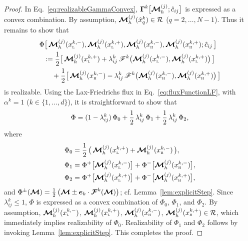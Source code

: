 \begin{proof}
  In Eq.~\eqref{eq:realizableGammaConvex}, $\boldsymbol{\Gamma}^{k}\big[\boldsymbol{\mathcal{M}}_{h}^{(j)};\hat{c}_{ij}\big]$ is expressed as a convex combination.  
  By assumption, $\boldsymbol{\mathcal{M}}_{h}^{(j)}(\hat{x}_{q}^{k})\in\mathcal{R}$ ($q=2,\ldots,N-1$).  
  Thus it remains to show that
  \begin{align*}
    &\Phi\big[\,\boldsymbol{\mathcal{M}}_{h}^{(j)}(x_{\textnormal{\tiny\textsc{L}}}^{k,-}),\boldsymbol{\mathcal{M}}_{h}^{(j)}(x_{\textnormal{\tiny\textsc{L}}}^{k,+}),\boldsymbol{\mathcal{M}}_{h}^{(j)}(x_{\textnormal{\tiny\textsc{H}}}^{k,-}),\boldsymbol{\mathcal{M}}_{h}^{(j)}(x_{\textnormal{\tiny\textsc{H}}}^{k,+});\hat{c}_{ij}\,\big] \\
    &\hspace{6pt}
    :=\frac{1}{2}\big[\,\boldsymbol{\mathcal{M}}_{h}^{(j)}(x_{\textnormal{\tiny\textsc{L}}}^{k,+})+\lambda_{ij}^{k}\,\mathscr{F}^{k}\big(\boldsymbol{\mathcal{M}}_{h}^{(j)}(x_{\textnormal{\tiny\textsc{L}}}^{k,-}),\boldsymbol{\mathcal{M}}_{h}^{(j)}(x_{\textnormal{\tiny\textsc{L}}}^{k,+})\big)\,\big] \\
    &\hspace{18pt}
    +\frac{1}{2}\big[\,\boldsymbol{\mathcal{M}}_{h}^{(j)}(x_{\textnormal{\tiny\textsc{H}}}^{k,-})-\lambda_{ij}^{k}\,\mathscr{F}^{k}\big(\boldsymbol{\mathcal{M}}_{h}^{(j)}(x_{\textnormal{\tiny\textsc{H}}}^{k,-}),\boldsymbol{\mathcal{M}}_{h}^{(j)}(x_{\textnormal{\tiny\textsc{H}}}^{k,+})\big)\,\big]
  \end{align*}
  is realizable.  
  Using the Lax-Friedrichs flux in Eq.~\eqref{eq:fluxFunctionLF}, with $\alpha^{k}=1$ ($k\in\{1,\ldots,d\}$), it is straightforward to show that
  \begin{equation}
    \Phi=(1-\lambda_{ij}^{k})\,\Phi_{0} + \frac{1}{2}\,\lambda_{ij}^{k}\,\Phi_{1} + \frac{1}{2}\,\lambda_{ij}^{k}\,\Phi_{2},
    \label{eq:phiConvex}
  \end{equation}
  where
  \begin{align*}
    \Phi_{0} &= \frac{1}{2}\,\big(\,\boldsymbol{\mathcal{M}}_{h}^{(j)}(x_{\textnormal{\tiny\textsc{L}}}^{k,+})+\boldsymbol{\mathcal{M}}_{h}^{(j)}(x_{\textnormal{\tiny\textsc{H}}}^{k,-})\,\big), \\
    \Phi_{1} &= \Phi^{+}\big[\boldsymbol{\mathcal{M}}_{h}^{(j)}(x_{\textnormal{\tiny\textsc{L}}}^{k,-})\big]+\Phi^{-}\big[\boldsymbol{\mathcal{M}}_{h}^{(j)}(x_{\textnormal{\tiny\textsc{H}}}^{k,-})\big], \\
    \Phi_{2} &= \Phi^{+}\big[\boldsymbol{\mathcal{M}}_{h}^{(j)}(x_{\textnormal{\tiny\textsc{L}}}^{k,+})\big]+\Phi^{-}\big[\boldsymbol{\mathcal{M}}_{h}^{(j)}(x_{\textnormal{\tiny\textsc{H}}}^{k,+})\big],
  \end{align*}
  and $\Phi^{\pm}(\boldsymbol{\mathcal{M}})=\frac{1}{2}\,\big(\boldsymbol{\mathcal{M}}\pm\boldsymbol{e}_{k}\cdot\boldsymbol{\mathcal{F}}^{k}(\boldsymbol{\mathcal{M}})\big)$; cf. Lemma~\ref{lem:explicitStep}.  
  Since $\lambda_{ij}^{k}\le1$, $\Phi$ is expressed as a convex combination of $\Phi_{0}$, $\Phi_{1}$, and $\Phi_{2}$.  
  By assumption, $\boldsymbol{\mathcal{M}}_{h}^{(j)}(x_{\textnormal{\tiny\textsc{L}}}^{k,-})$, $\boldsymbol{\mathcal{M}}_{h}^{(j)}(x_{\textnormal{\tiny\textsc{L}}}^{k,+})$, $\boldsymbol{\mathcal{M}}_{h}^{(j)}(x_{\textnormal{\tiny\textsc{H}}}^{k,-})$, $\boldsymbol{\mathcal{M}}_{h}^{(j)}(x_{\textnormal{\tiny\textsc{H}}}^{k,+})\in\mathcal{R}$, which immediately implies realizability of $\Phi_{0}$.  
  Realizability of $\Phi_{1}$ and $\Phi_{2}$ follows by invoking Lemma~\ref{lem:explicitStep}.  
  This completes the proof.  
\end{proof}

